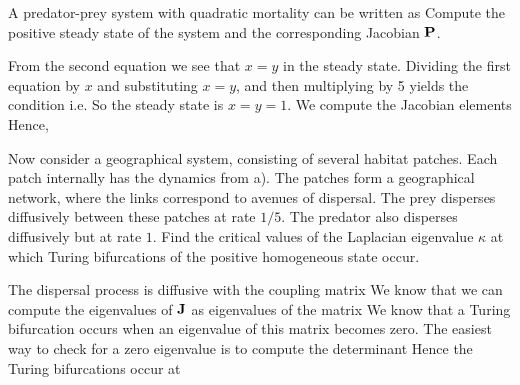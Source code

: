 A predator-prey system with quadratic mortality can be written as 
\subquestion Compute the positive steady state of the system and the corresponding Jacobian $\bf P$.

\solution
From the second equation we see that $x=y$ in the steady state. Dividing the first equation by $x$ and substituting $x=y$, and then multiplying by 5 yields the condition
i.e.
So the steady state is $x=y=1$. We compute the Jacobian elements
Hence,

\subquestion  Now consider a geographical system, consisting of several habitat patches. Each patch internally has the dynamics from a). The patches form a geographical network, where the links correspond to avenues of dispersal. The prey disperses diffusively between these patches at rate $1/5$. The predator also disperses diffusively but at rate $1$. Find the critical values of the Laplacian eigenvalue $\kappa$ at which Turing bifurcations of the positive homogeneous state occur. 

\solution
The dispersal process is diffusive with the coupling matrix  
We know that we can compute the eigenvalues of $\bf J$ as eigenvalues of the matrix  
We know that a Turing bifurcation occurs when an eigenvalue of this matrix becomes zero. The easiest way to check for a zero eigenvalue is to compute the determinant
Hence the Turing bifurcations occur at 

